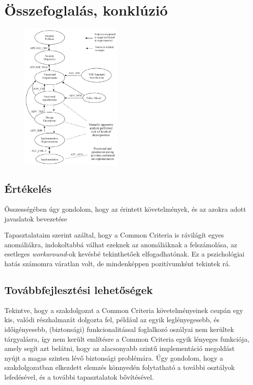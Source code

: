\chapter{Összefoglalás, konklúzió}

\begin{figure}
    \includegraphics[width=0.45\textwidth, keepaspectratio]{figures/layers.png}
\end{figure}
\section{Értékelés}

Összességében úgy gondolom, hogy az érintett követelmények, és az azokra adott javaslatok bevezetése


Tapasztalataim szerint azáltal, hogy a Common Criteria is rávilágít egyes anomáliákra, indokoltabbá
válhat ezeknek az anomáliáknak a felszámolása, az esetleges \emph{workaround}-ok kevésbé
tekinthetőek elfogadhatónak. Ez a pszichológiai hatás számomra váratlan volt, de mindenképpen
pozitívumként tekintek rá.

\section{Továbbfejlesztési lehetőségek}
Tekintve, hogy a szakdolgozat a Common Criteria követelményeinek csupán egy kis, valódi részhalmazát
dolgozta fel, például az egyik leglényegesebb, és időigényesebb, (biztonsági) funkcionalitással
foglalkozó oszályai nem kerültek tárgyalásra, így nem került említésre a Common Criteria egyik
lényeges funkciója, amely segít azt belátni, hogy az alacsonyabb szintű implementáció megoldást
nyújt a magas szinten lévő biztonsági problémára.
Úgy gondolom, hogy a szakdolgozatban elkezdett elemzés könnyedén folytatható a további osztályok
lefedésével, és a további tapasztalatok bővítésével.
